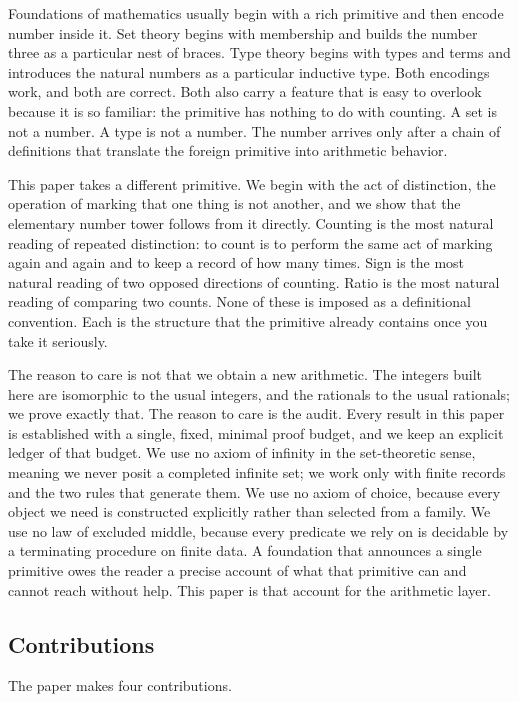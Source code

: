 \documentclass[11pt,a4paper]{article}
\theoremstyle{definition}
\theoremstyle{remark}
\begin{document}
Foundations of mathematics usually begin with a rich primitive and then encode
number inside it. Set theory begins with membership and builds the number three
as a particular nest of braces. Type theory begins with types and terms and
introduces the natural numbers as a particular inductive type. Both encodings
work, and both are correct. Both also carry a feature that is easy to overlook
because it is so familiar: the primitive has nothing to do with counting. A set
is not a number. A type is not a number. The number arrives only after a chain
of definitions that translate the foreign primitive into arithmetic behavior.

This paper takes a different primitive. We begin with the act of distinction,
the operation of marking that one thing is not another, and we show that the
elementary number tower follows from it directly. Counting is the most natural
reading of repeated distinction: to count is to perform the same act of marking
again and again and to keep a record of how many times. Sign is the most
natural reading of two opposed directions of counting. Ratio is the most natural
reading of comparing two counts. None of these is imposed as a definitional
convention. Each is the structure that the primitive already contains once you
take it seriously.

The reason to care is not that we obtain a new arithmetic. The integers built
here are isomorphic to the usual integers, and the rationals to the usual
rationals; we prove exactly that. The reason to care is the audit. Every result
in this paper is established with a single, fixed, minimal proof budget, and we
keep an explicit ledger of that budget. We use no axiom of infinity in the
set-theoretic sense, meaning we never posit a completed infinite set; we work
only with finite records and the two rules that generate them. We use no axiom
of choice, because every object we need is constructed explicitly rather than
selected from a family. We use no law of excluded middle, because every
predicate we rely on is decidable by a terminating procedure on finite data. A
foundation that announces a single primitive owes the reader a precise account
of what that primitive can and cannot reach without help. This paper is that
account for the arithmetic layer.

\subsection{Contributions}

The paper makes four contributions.
\end{document}
